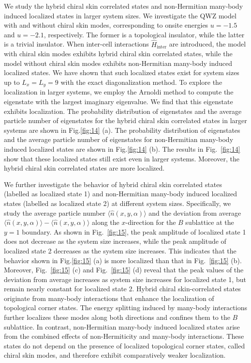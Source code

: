\documentclass[longbibliography, aps, prx, amsmath, amssymb, amsfonts, twocolumn,superscriptaddress, footinbib]{revtex4-1}
\begin{document}
	We study the hybrid chiral skin correlated states and non-Hermitian many-body induced localized states in larger system sizes. 
	We investigate the QWZ model with and without chiral skin modes, corresponding to onsite energies $u=-1.5$ and $u=-2.1$, respectively. The former is a topological insulator, while the latter is a trivial insulator. When inter-cell interactions $\hat{H}_{\text{inter}}$ are introduced, the model with chiral skin modes exhibits hybrid chiral skin correlated states, while the model without chiral skin modes exhibits non-Hermitian many-body induced localized states.
	We have shown that such localized states exist for system sizes up to $L_x = L_y = 9$ with the exact diagonalization method. To explore the localization in larger systems, we employ the Arnoldi method to compute the eigenstate with the largest imaginary eigenvalue. 
	We find that this eigenstate exhibits localization.
	The probability distribution of eigenstates and the average particle number of eigenstates for the hybrid chiral skin correlated states in larger systems are shown in Fig.\ref{fig:14} (a). 
	The probability distribution of eigenstates and the average particle number of eigenstates for non-Hermitian many-body induced localized states are shown in Fig.\ref{fig:14} (b). The results in Fig.~\ref{fig:14} show that these localized states still exist even in larger systems. Moreover, the hybrid chiral skin correlated states are more localized.


	We further investigate the behavior of hybrid chiral skin correlated states (labelled as localized state 1) and non-Hermitian many-body induced localized states (labelled as localized state 2) at different system sizes. Specifically, we study the average particle number $\langle \hat{n}(x, y, \alpha) \rangle$ and the deviation from average $\langle \hat{n}(x, y, \alpha) \rangle - \overline{\langle \hat{n}(x, y, \alpha) \rangle}$ along the $x$-direction for the $B$ sublattice at the $y = 1$ boundary.
	As shown in Fig.~\ref{fig:15}, the peak amplitude of localized state 1 does not decrease as the system size increases, while the peak amplitude of localized state 2 decreases as the system size increases. This indicates that the behavior shown in Fig.\ref{fig:15} (a) is more localized than that in Fig.~\ref{fig:15} (b).
	Moreover, Fig.~\ref{fig:15} (c) and Fig.~\ref{fig:15} (d) reveal that the peak values of the deviation from average increases as system size increases for localized state 1, but remain nearly constant for localized state 2.
	Hybrid chiral skin-correlated states originate from many-body interactions that enhance the localization of topological corner states. 
	The energy splitting induced by many-body interactions further localizes these modes along both directions and confines them to the $B$ sublattice.
	In contrast, non-Hermitian many-body induced localized states arise from the combined effects of non-Hermiticity and many-body interactions. These states do not depend on the presence of localized topological corner states, called chiral skin modes, and therefore exhibit comparatively weaker localization.
\end{document}
